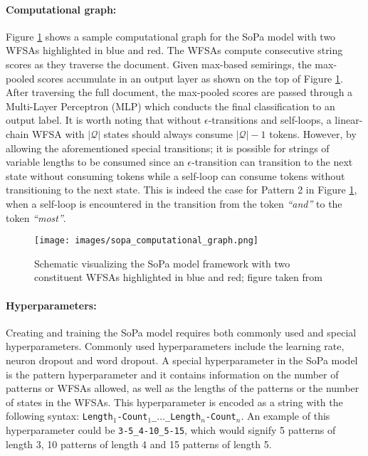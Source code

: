 \paragraph{Computational graph:} Figure \ref{fig:sopa} shows a sample computational graph for the SoPa model with two WFSAs highlighted in blue and red. The WFSAs compute consecutive string scores as they traverse the document. Given max-based semirings, the max-pooled scores accumulate in an output layer as shown on the top of Figure \ref{fig:sopa}. After traversing the full document, the max-pooled scores are passed through a Multi-Layer Perceptron (MLP) which conducts the final classification to an output label. It is worth noting that without $\epsilon$-transitions and self-loops, a linear-chain WFSA with $|\mathcal{Q}|$ states should always consume $\mathcal{|Q|}-1$ tokens. However, by allowing the aforementioned special transitions; it is possible for strings of variable lengths to be consumed since an $\epsilon$-transition can transition to the next state without consuming tokens while a self-loop can consume tokens without transitioning to the next state. This is indeed the case for Pattern 2 in Figure \ref{fig:sopa}, when a self-loop is encountered in the transition from the token \textit{``and''} to the token \textit{``most''}.

\begin{figure}[t]
  \centering
  \texttt{[image: images/sopa\_computational\_graph.png]}
  \caption{Schematic visualizing the SoPa model framework with two constituent WFSAs highlighted in blue and red; figure taken from \citet{schwartz2018sopa}}
  \label{fig:sopa}
\end{figure}

\paragraph{Hyperparameters:} Creating and training the SoPa model requires both commonly used and special hyperparameters. Commonly used hyperparameters include the learning rate, neuron dropout and word dropout. A special hyperparameter in the SoPa model is the pattern hyperparameter and it contains information on the number of patterns or WFSAs allowed, as well as the lengths of the patterns or the number of states in the WFSAs. This hyperparameter is encoded as a string with the following syntax: \texttt{Length$_{1}$-Count$_{1}$\_$\dots$\_Length$_{n}$-Count$_{n}$}. An example of this hyperparameter could be \texttt{3-5\_4-10\_5-15}, which would signify 5 patterns of length 3, 10 patterns of length 4 and 15 patterns of length 5.

